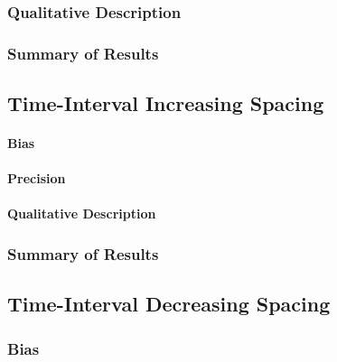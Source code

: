 \documentclass[
12pt, %
twoside,
english]{guelphthesis}
\begin{document}
\hypertarget{qualitative-equal-exp2}{%
\subsubsection{Qualitative Description}\label{qualitative-equal-exp2}}

\hypertarget{summary-of-results-4}{%
\subsubsection{Summary of Results}\label{summary-of-results-4}}

\hypertarget{time-interval-increasing-spacing-1}{%
\subsection{Time-Interval Increasing Spacing}\label{time-interval-increasing-spacing-1}}

\hypertarget{bias-time-inc-exp2}{%
\paragraph{Bias}\label{bias-time-inc-exp2}}

\hypertarget{precision-time-inc-exp2}{%
\paragraph{Precision}\label{precision-time-inc-exp2}}

\hypertarget{qualitative-time-inc-exp2}{%
\paragraph{Qualitative Description}\label{qualitative-time-inc-exp2}}

\hypertarget{summary-of-results-5}{%
\subsubsection{Summary of Results}\label{summary-of-results-5}}

\hypertarget{time-interval-decreasing-spacing-1}{%
\subsection{Time-Interval Decreasing Spacing}\label{time-interval-decreasing-spacing-1}}

\hypertarget{bias-time-dec-exp2}{%
\subsubsection{Bias}\label{bias-time-dec-exp2}}
\end{document}

